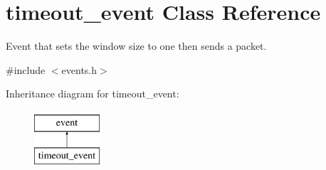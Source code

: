 \hypertarget{classtimeout__event}{\section{timeout\-\_\-event Class Reference}
\label{classtimeout__event}
}


Event that sets the window size to one then sends a packet.  




{\ttfamily \#include $<$events.\-h$>$}

Inheritance diagram for timeout\-\_\-event\-:\begin{figure}[H]
\begin{center}
\leavevmode
\includegraphics[height=2.000000cm]{classtimeout__event}
\end{center}
\end{figure}
